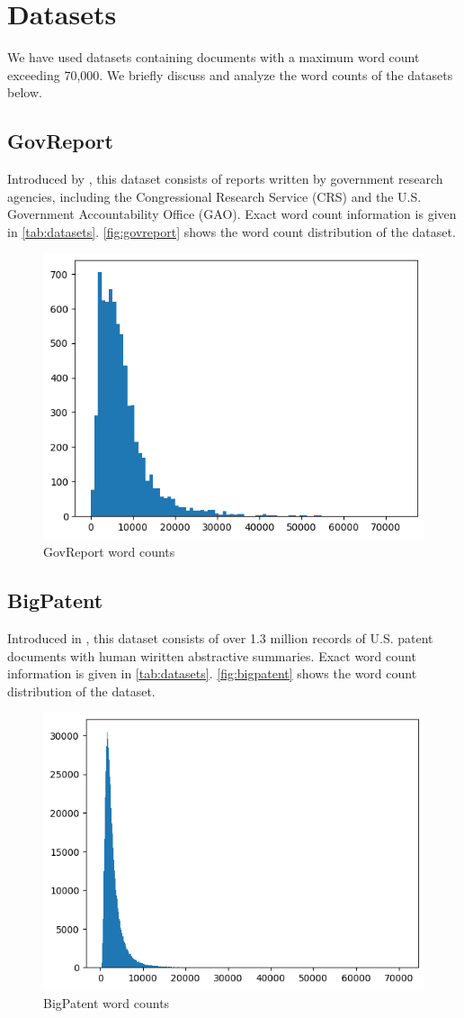 \section{Datasets}
	\label{sec:datasets}

	We have used datasets containing documents with a maximum word count exceeding 70,000.
	We briefly discuss and analyze the word counts of the datasets below.


\subsection*{GovReport}

	Introduced by \citet{huang-etal-2021-efficient}, this dataset consists of reports written
	by government research agencies, including the Congressional Research Service (CRS) and
	the U.S. Government Accountability Office (GAO).
	Exact word count information is given in \autoref{tab:datasets}.
	\autoref{fig:govreport} shows the word count distribution of the dataset.

	\begin{figure}[!ht]
		\centering
		\includegraphics[width=.48\textwidth]{Images/govreport-wordcount.png}
		\caption{GovReport word counts}
		\label{fig:govreport}
	\end{figure}


\subsection*{BigPatent}

	Introduced in \citet{sharma-etal-2019-bigpatent}, this dataset consists of over 1.3 million
	records of U.S. patent documents with human wiritten abstractive summaries.
	Exact word count information is given in \autoref{tab:datasets}.
	\autoref{fig:bigpatent} shows the word count distribution of the dataset.

	\begin{figure}[!ht]
		\centering
		\includegraphics[width=.48\textwidth]{Images/bigpatent-wordcount.png}
		\caption{BigPatent word counts}
		\label{fig:bigpatent}
	\end{figure}

